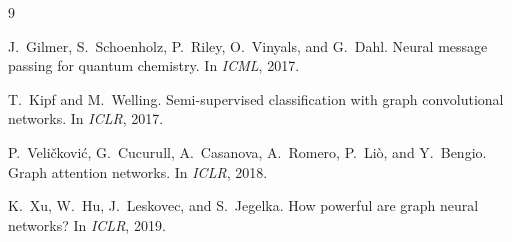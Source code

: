 \documentclass[11pt,a4paper]{article}
\begin{document}

\begin{thebibliography}{9}

J.~Gilmer, S.~Schoenholz, P.~Riley, O.~Vinyals, and G.~Dahl.
\newblock Neural message passing for quantum chemistry.
\newblock In \emph{ICML}, 2017.

T.~Kipf and M.~Welling.
\newblock Semi-supervised classification with graph convolutional networks.
\newblock In \emph{ICLR}, 2017.

P.~Veli\v{c}kovi\'{c}, G.~Cucurull, A.~Casanova, A.~Romero, P.~Li\`{o}, and Y.~Bengio.
\newblock Graph attention networks.
\newblock In \emph{ICLR}, 2018.

K.~Xu, W.~Hu, J.~Leskovec, and S.~Jegelka.
\newblock How powerful are graph neural networks?
\newblock In \emph{ICLR}, 2019.

\end{thebibliography}
\end{document}
